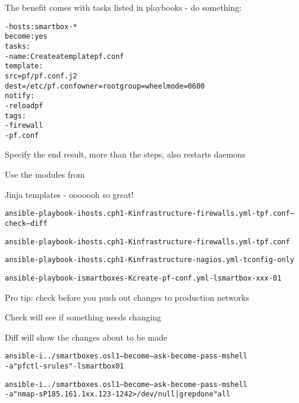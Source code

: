 \documentclass[Screen16to9,17pt]{foils}
\begin{document}

The benefit comes with tasks listed in playbooks - do something:

\begin{alltt}\footnotesize
  - hosts: smartbox-*
    become: yes
    tasks:
    - name: Create a template pf.conf
      template:
        src=pf/pf.conf.j2
        dest=/etc/pf.conf owner=root group=wheel mode=0600
     notify:
        - reload pf
      tags:
        - firewall
        - pf.conf
\end{alltt}

\begin{list2}
\item Specify the end result, more than the steps, also restarts daemons
\item Use the modules from\\
\item Jinja templates - ooooooh so great!
\end{list2}


\begin{alltt}\footnotesize
ansible-playbook -i hosts.cph1 -K infrastructure-firewalls.yml -t pf.conf --check --diff

ansible-playbook -i hosts.cph1 -K infrastructure-firewalls.yml -t pf.conf

ansible-playbook -i hosts.cph1 -K infrastructure-nagios.yml -t config-only

ansible-playbook -i smartboxes -K create-pf-conf.yml -l smartbox-xxx-01
\end{alltt}

\begin{list2}
\item Pro tip: check before you push out changes to production networks \smiley
\item Check will see if something needs changing
\item Diff will show the changes about to be made
\end{list2}


\begin{alltt}\footnotesize
ansible -i ../smartboxes.osl1 --become --ask-become-pass -m shell
-a "pfctl -s rules" -l smartbox01

ansible -i ../smartboxes.osl1 --become --ask-become-pass -m shell
-a "nmap -sP 185.161.1xx.123-124 2> /dev/null| grep done" all
\end{alltt}
\end{document}
